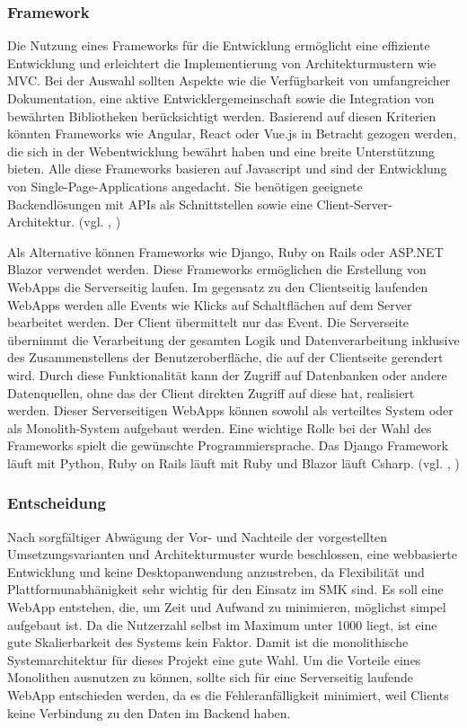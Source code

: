 \subsubsection{Framework}
\label{sec:Framework}
Die Nutzung eines Frameworks für die Entwicklung ermöglicht eine effiziente Entwicklung und erleichtert die Implementierung von Architekturmustern wie \zB MVC. Bei der Auswahl sollten Aspekte wie die Verfügbarkeit von umfangreicher Dokumentation, eine aktive Entwicklergemeinschaft sowie die Integration von bewährten Bibliotheken berücksichtigt werden. Basierend auf diesen Kriterien könnten Frameworks wie Angular, React oder Vue.js in Betracht gezogen werden, die sich in der Webentwicklung bewährt haben und eine breite Unterstützung bieten. Alle diese Frameworks basieren auf Javascript und sind der Entwicklung von Single-Page-Applications angedacht. Sie benötigen geeignete Backendlösungen mit APIs als Schnittstellen sowie eine  Client-Server-Architektur. (vgl. \cite{SPA}, \cite{serverside})

Als Alternative können Frameworks wie Django, Ruby on Rails oder ASP.NET Blazor verwendet werden. Diese Frameworks ermöglichen die Erstellung von WebApps die Serverseitig laufen. Im gegensatz zu den Clientseitig laufenden WebApps werden alle Events wie \zB Klicks auf Schaltflächen auf dem Server bearbeitet werden. Der Client übermittelt nur das Event. Die Serverseite übernimmt die Verarbeitung der gesamten Logik und Datenverarbeitung inklusive des Zusammenstellens der Benutzeroberfläche, die auf der Clientseite gerendert wird. Durch diese Funktionalität kann der Zugriff auf Datenbanken oder andere Datenquellen, ohne das der Client direkten Zugriff auf diese hat, realisiert werden. Dieser Serverseitigen WebApps können sowohl als verteiltes System oder als Monolith-System aufgebaut werden. Eine wichtige Rolle bei der Wahl des Frameworks spielt die gewünschte Programmiersprache. Das Django Framework läuft mit Python, Ruby on Rails läuft mit Ruby und Blazor läuft \bzw Csharp. (vgl. \cite{BalazorServer}, \cite{serverFrameworks})

\subsubsection{Entscheidung}
\label{sec:Entscheidung}
Nach sorgfältiger Abwägung der Vor- und Nachteile der vorgestellten Umsetzungsvarianten und Architekturmuster wurde beschlossen, eine webbasierte Entwicklung und keine Desktopanwendung anzustreben, da Flexibilität und Plattformunabhänigkeit sehr wichtig für den Einsatz im SMK sind. Es soll eine WebApp entstehen, die, um Zeit und Aufwand zu minimieren, möglichst simpel aufgebaut ist. Da die Nutzerzahl selbst im Maximum unter 1000 liegt, ist eine gute Skalierbarkeit des Systems kein Faktor. Damit ist die monolithische Systemarchitektur für dieses Projekt eine gute Wahl. Um die Vorteile eines Monolithen ausnutzen zu können, sollte sich für eine Serverseitig laufende WebApp entschieden werden, da es die Fehleranfälligkeit minimiert, weil Clients keine Verbindung zu den Daten im Backend haben.

